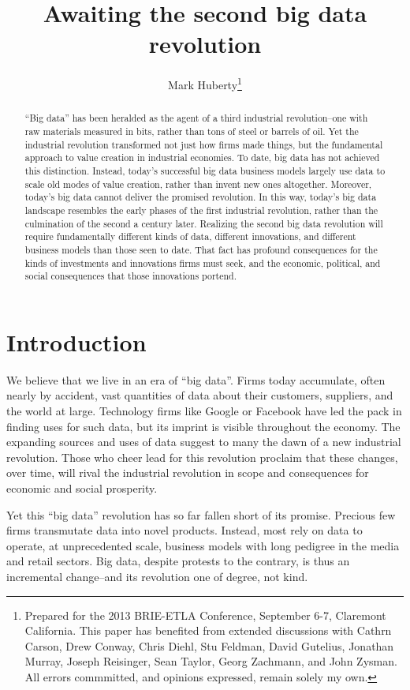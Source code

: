 \documentclass[12pt]{article}
\title{Awaiting the second big data revolution}
\author{Mark Huberty\thanks{Prepared for the 2013 BRIE-ETLA
    Conference, September 6-7, Claremont California. This paper has
    benefited from extended discussions with Cathrn Carson, Drew
    Conway, Chris Diehl, Stu Feldman, David
    Gutelius, Jonathan Murray, Joseph Reisinger, Sean Taylor, Georg Zachmann, and John
    Zysman. All errors commmitted, and opinions expressed, remain
    solely my own.}}
\begin{document}
\maketitle
\begin{abstract}
``Big data'' has been heralded as the agent of a third industrial
revolution--one with raw materials measured in bits, rather than tons
of steel or barrels of oil. Yet the industrial revolution transformed not just how
firms made things, but the fundamental approach to value creation in
industrial economies. To date, big data has not achieved this
distinction. Instead, today's successful big data business models
largely use data to scale old modes of value creation, rather than
invent new ones altogether. Moreover, today's big data cannot deliver
the promised revolution. In this way, today's big data landscape
resembles the early phases of the first industrial revolution, rather
than the culmination of the second a century later. Realizing the
second big data revolution will require fundamentally different kinds
of data, different innovations, and different business models than
those seen to date. That fact has profound consequences for the kinds
of investments and innovations firms must seek, and the economic,
political, and social consequences that those innovations portend.
\end{abstract}


\section{Introduction}
\label{sec:introduction}

We believe that we live in an era of ``big data''. Firms today
accumulate, often nearly by accident, vast quantities of data about
their customers, suppliers, and the world at large. Technology firms
like Google or Facebook have led the pack in finding uses for such
data, but its imprint is visible throughout the economy. The expanding
sources and uses of data suggest to many the dawn of a new industrial
revolution. Those who cheer lead for this revolution proclaim that
these changes, over time, will rival the industrial revolution in
scope and consequences for economic and social prosperity.

Yet this ``big data'' revolution has so far fallen short of its
promise. Precious few firms transmutate data into novel
products. Instead, most rely on data to operate, at unprecedented
scale, business models with long pedigree in the media and retail
sectors. Big data, despite protests to the contrary, is thus an
incremental change--and its revolution one of degree, not kind. 
\end{document}
